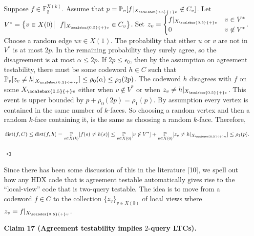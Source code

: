 Suppose $f\in\mathbb{F}_{q}^{X(k)}$.
Assume that $p=\operatorname*{\mathbb{P}}_{v}[f|_{{X}_{\scalebox{0.5}{+}v}}\not\in C_{v}]$. Let $V^{*}=\left\{v\in X(0)\left|\;\vphantom{v\in X(0)f|_{{X}_{\scalebox{0.5}{+}v}}\in C_{v}}\right.f|_{{X}_{\scalebox{0.5}{+}v}}\in C_{v}\right\}$. Set $z_{v}=\begin{cases}f|_{{X}_{\scalebox{0.5}{+}v}}&v\in V^{*}\\
0&v\not\in V^{*}\end{cases}$.
Choose a random edge $uv\in X(1)$. The probability that either $u$ or $v$ are not in $V^{*}$ is at most $2p$. In the remaining probability they surely agree, so the disagreement is at most $\alpha\leq 2p$.
If $2p\leq\epsilon_{0}$, then by the assumption on agreement testability, there must be some codeword $h\in C$ such that
$\operatorname*{\mathbb{P}}_{v}[z_{v}\neq h|_{{X}_{\scalebox{0.5}{+}v}}]\leq\rho_{0}(\alpha)\leq\rho_{0}(2p)$.
The codeword $h$ disagrees with $f$ on some ${X}_{\scalebox{0.5}{+}v}$ either when $v\not\in V^{*}$ or when $z_{v}\neq h|_{{X}_{\scalebox{0.5}{+}v}}$. This event is upper bounded by $p+\rho_{0}(2p)=\rho_{1}(p)$. By assumption every vertex is contained in the same number of $k$-faces. So choosing a random vertex and then a random $k$-face containing it, is the same as choosing a random $k$-face. Therefore,\par


\[\begin{gathered}
\operatorname{dist}(f,C)\leq\operatorname{dist}(f,h)=\operatorname*{\mathbb{P}}_{s\in X(k)}[f(s)\neq h(s)]\leq\operatorname*{\mathbb{P}}_{v\in X(0)}[v\not\in V^{*}]+\operatorname*{\mathbb{P}}_{v\in X(0)}[z_{v}\neq h|_{{X}_{\scalebox{0.5}{+}v}}]\leq\rho_{1}(p).
\end{gathered}\]


$\vartriangleleft$\par




Since there has been some discussion of this in the literature [10], we spell out how any HDX code that is agreement testable automatically gives rise to the “local-view” code that is two-query testable. The idea is to move from a codeword $f\in C$ to the collection $\{z_{v}\}_{v\in X(0)}$ of local views where $z_{v}=f|_{{X}_{\scalebox{0.5}{+}v}}$.\par





\par\medskip\noindent\textbf{
Claim 17 (Agreement testability implies $2$-query LTCs). 
}\par



